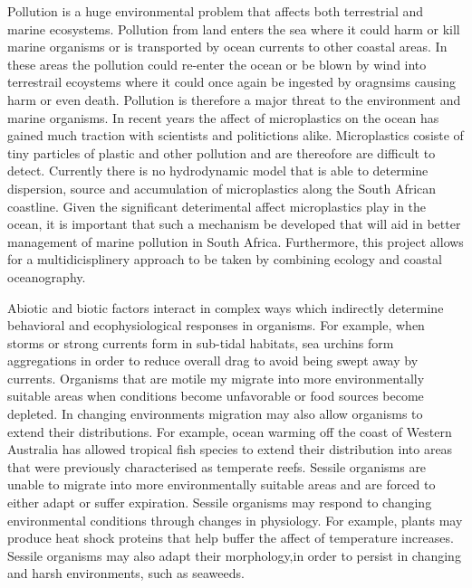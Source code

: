 \documentclass[]{article}
\begin{document}
Pollution is a huge environmental problem that affects both terrestrial
and marine ecosystems. Pollution from land enters the sea where it could
harm or kill marine organisms or is transported by ocean currents to
other coastal areas. In these areas the pollution could re-enter the
ocean or be blown by wind into terrestrail ecoystems where it could once
again be ingested by oragnsims causing harm or even death. Pollution is
therefore a major threat to the environment and marine organisms. In
recent years the affect of microplastics on the ocean has gained much
traction with scientists and politictions alike. Microplastics cosiste
of tiny particles of plastic and other pollution and are thereofore are
difficult to detect. Currently there is no hydrodynamic model that is
able to determine dispersion, source and accumulation of microplastics
along the South African coastline. Given the significant deterimental
affect microplastics play in the ocean, it is important that such a
mechanism be developed that will aid in better management of marine
pollution in South Africa. Furthermore, this project allows for a
multidicisplinery approach to be taken by combining ecology and coastal
oceanography.

Abiotic and biotic factors interact in complex ways which indirectly
determine behavioral and ecophysiological responses in organisms. For
example, when storms or strong currents form in sub-tidal habitats, sea
urchins form aggregations in order to reduce overall drag to avoid being
swept away by currents. Organisms that are motile my migrate into more
environmentally suitable areas when conditions become unfavorable or
food sources become depleted. In changing environments migration may
also allow organisms to extend their distributions. For example, ocean
warming off the coast of Western Australia has allowed tropical fish
species to extend their distribution into areas that were previously
characterised as temperate reefs. Sessile organisms are unable to
migrate into more environmentally suitable areas and are forced to
either adapt or suffer expiration. Sessile organisms may respond to
changing environmental conditions through changes in physiology. For
example, plants may produce heat shock proteins that help buffer the
affect of temperature increases. Sessile organisms may also adapt their
morphology,in order to persist in changing and harsh environments, such
as seaweeds.
\end{document}
